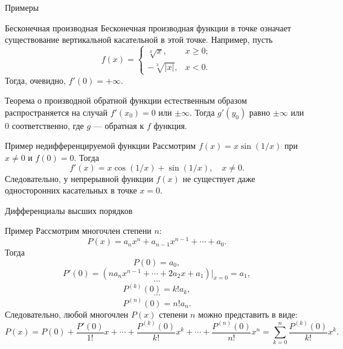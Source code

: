 \documentclass[8pt]{beamer}
\begin{document}
\begin{frame}{Примеры}
\begin{block}{Бесконечная производная}
Бесконечная производная функции в точке означает существование вертикальной касательной в этой точке. Например, пусть 
$$f(x)=\left\{ \begin{array}{cl}
\sqrt[3]{x},& x\ge0;\\
-\sqrt[3]{|x|},& x<0.
\end{array}\right.
$$
Тогда, очевидно, $f'(0) = +\infty$.
\end{block}
Теорема о производной обратной функции естественным образом распространяется на случай $f'(x_0) = 0$ или $\pm\infty$. Тогда $g'(y_0)$ равно $\pm\infty$ или $0$ соответственно, где $g$ --- обратная к $f$ функция.
\begin{block}{Пример недифференцируемой функции}
Рассмотрим $f(x) = x \sin(1/x)$ при $x\ne0$ и $f(0) = 0$. Тогда
$$f'(x) = x \cos(1/x)+\sin(1/x),\quad x\ne0.$$
Следовательно, у непрерывной функции $f(x)$ не существует даже односторонних касательных в точке $x=0$.
\end{block}
\end{frame}


\begin{frame}{Дифференциалы высших порядков}
\begin{block}{Пример}
Рассмотрим многочлен степени $n$:
$$P(x) = a_n x^n + a_{n-1} x^{n-1}+\cdots+a_0.$$
Тогда
$$P(0) = a_0,$$
$$P'(0) = \left(n a_n x^{n-1}+\cdots+2 a_2 x+a_1\right)\Big|_{x=0} = a_1,$$
$$\cdots$$
$$P^{(k)}(0) = k! a_k,$$
$$\cdots$$
$$P^{(n)}(0) = n! a_n.$$
Следовательно, любой многочлен $P(x)$ степени $n$ можно представить в виде:
$$P(x) = P(0) + \frac{P'(0)}{1!}x+\cdots+\frac{P^{(k)}(0)}{k!}x^k+\cdots+\frac{P^{(n)}(0)}{n!}x^n = \sum_{k=0}^n \frac{P^{(k)}(0)}{k!}x^k.$$
\end{block}
\end{frame}
\end{document}

